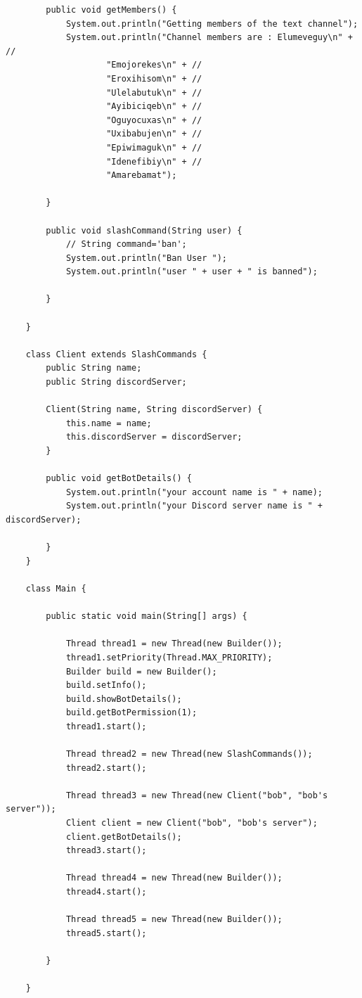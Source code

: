 \documentclass{article}
\begin{document}
\begin{lstlisting}
        public void getMembers() {
            System.out.println("Getting members of the text channel");
            System.out.println("Channel members are : Elumeveguy\n" + //
                    "Emojorekes\n" + //
                    "Eroxihisom\n" + //
                    "Ulelabutuk\n" + //
                    "Ayibiciqeb\n" + //
                    "Oguyocuxas\n" + //
                    "Uxibabujen\n" + //
                    "Epiwimaguk\n" + //
                    "Idenefibiy\n" + //
                    "Amarebamat");
    
        }
    
        public void slashCommand(String user) {
            // String command='ban';
            System.out.println("Ban User ");
            System.out.println("user " + user + " is banned");
    
        }
    
    }
    
    class Client extends SlashCommands {
        public String name;
        public String discordServer;
    
        Client(String name, String discordServer) {
            this.name = name;
            this.discordServer = discordServer;
        }
    
        public void getBotDetails() {
            System.out.println("your account name is " + name);
            System.out.println("your Discord server name is " + discordServer);
    
        }
    }
    
    class Main {
    
        public static void main(String[] args) {
    
            Thread thread1 = new Thread(new Builder());
            thread1.setPriority(Thread.MAX_PRIORITY);
            Builder build = new Builder();
            build.setInfo();
            build.showBotDetails();
            build.getBotPermission(1);
            thread1.start();
    
            Thread thread2 = new Thread(new SlashCommands());
            thread2.start();
    
            Thread thread3 = new Thread(new Client("bob", "bob's server"));
            Client client = new Client("bob", "bob's server");
            client.getBotDetails();
            thread3.start();
    
            Thread thread4 = new Thread(new Builder());
            thread4.start();
    
            Thread thread5 = new Thread(new Builder());
            thread5.start();
    
        }
    
    }
\end{lstlisting}
\end{document}

